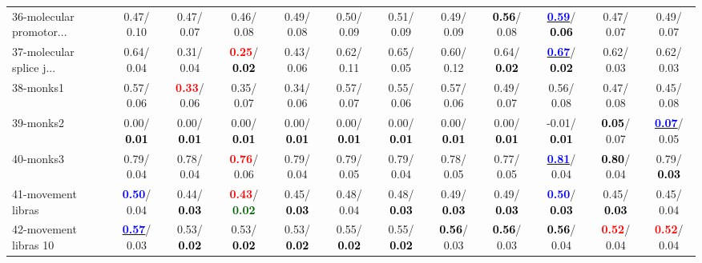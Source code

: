\begin{table}[h]
\begin{center}
{\begin{tabular}{lc|c|c|c|c|c|c|c|c|c|c}
36-molecular promotor... &   0.47/  0.10 &   0.47/  0.07 &   0.46/  0.08 &   0.49/  0.08 &   0.50/  0.09 &   0.51/  0.09 &   0.49/  0.09 & \textcolor{black}{\textbf{  0.56}}/  0.08 & \underline{\textcolor{blue}{\textbf{  0.59}}}/\textcolor{black}{\textbf{  0.06}} &   0.47/  0.07 &   0.49/  0.07 \\
37-molecular splice j... &   0.64/  0.04 &   0.31/  0.04 & \textcolor{red}{\textbf{  0.25}}/\textcolor{black}{\textbf{  0.02}} &   0.43/  0.06 &   0.62/  0.11 &   0.65/  0.05 &   0.60/  0.12 &   0.64/\textcolor{black}{\textbf{  0.02}} & \underline{\textcolor{blue}{\textbf{  0.67}}}/\textcolor{black}{\textbf{  0.02}} &   0.62/  0.03 &   0.62/  0.03 \\
38-monks1 &   0.57/  0.06 & \textcolor{red}{\textbf{  0.33}}/  0.06 &   0.35/  0.07 &   0.34/  0.06 &   0.57/  0.07 &   0.55/  0.06 &   0.57/  0.06 &   0.49/  0.07 &   0.56/  0.08 &   0.47/  0.08 &   0.45/  0.08 \\
39-monks2 &   0.00/\textcolor{black}{\textbf{  0.01}} &   0.00/\textcolor{black}{\textbf{  0.01}} &   0.00/\textcolor{black}{\textbf{  0.01}} &   0.00/\textcolor{black}{\textbf{  0.01}} &   0.00/\textcolor{black}{\textbf{  0.01}} &   0.00/\textcolor{black}{\textbf{  0.01}} &   0.00/\textcolor{black}{\textbf{  0.01}} &   0.00/\textcolor{black}{\textbf{  0.01}} &  -0.01/\textcolor{black}{\textbf{  0.01}} & \textcolor{black}{\textbf{  0.05}}/  0.07 & \underline{\textcolor{blue}{\textbf{  0.07}}}/  0.05 \\ \hline
40-monks3 &   0.79/  0.04 &   0.78/  0.04 & \textcolor{red}{\textbf{  0.76}}/  0.06 &   0.79/  0.04 &   0.79/  0.05 &   0.79/  0.04 &   0.78/  0.05 &   0.77/  0.05 & \underline{\textcolor{blue}{\textbf{  0.81}}}/  0.04 & \textcolor{black}{\textbf{  0.80}}/  0.04 &   0.79/\textcolor{black}{\textbf{  0.03}} \\
41-movement libras & \textcolor{blue}{\textbf{  0.50}}/  0.04 &   0.44/\textcolor{black}{\textbf{  0.03}} & \textcolor{red}{\textbf{  0.43}}/\textcolor{darkgreen}{\textbf{  0.02}} &   0.45/\textcolor{black}{\textbf{  0.03}} &   0.48/  0.04 &   0.48/\textcolor{black}{\textbf{  0.03}} &   0.49/\textcolor{black}{\textbf{  0.03}} &   0.49/\textcolor{black}{\textbf{  0.03}} & \textcolor{blue}{\textbf{  0.50}}/\textcolor{black}{\textbf{  0.03}} &   0.45/\textcolor{black}{\textbf{  0.03}} &   0.45/  0.04 \\
42-movement libras 10 & \underline{\textcolor{blue}{\textbf{  0.57}}}/  0.03 &   0.53/\textcolor{black}{\textbf{  0.02}} &   0.53/\textcolor{black}{\textbf{  0.02}} &   0.53/\textcolor{black}{\textbf{  0.02}} &   0.55/\textcolor{black}{\textbf{  0.02}} &   0.55/\textcolor{black}{\textbf{  0.02}} & \textcolor{black}{\textbf{  0.56}}/  0.03 & \textcolor{black}{\textbf{  0.56}}/  0.03 & \textcolor{black}{\textbf{  0.56}}/  0.04 & \textcolor{red}{\textbf{  0.52}}/  0.04 & \textcolor{red}{\textbf{  0.52}}/  0.04 \\

\end{tabular}}
\end{center}
\end{table}
